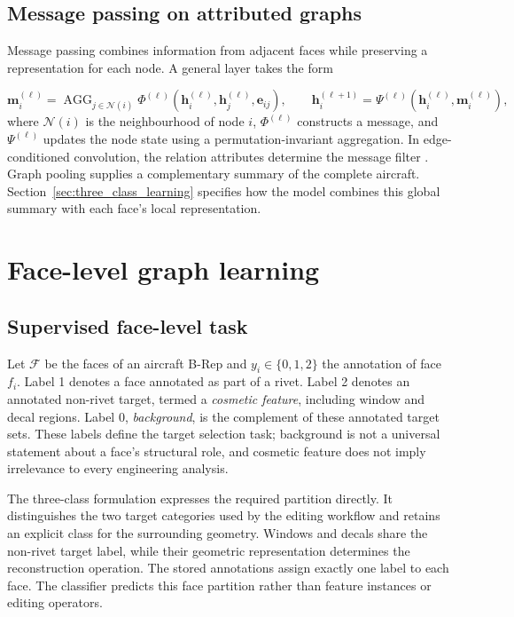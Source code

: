 \documentclass[12pt,a4paper]{article}
\begin{document}
\subsection{Message passing on attributed graphs}\label{sec:message_passing_preliminary}

Message passing combines information from adjacent faces while preserving a representation for each node. A general layer takes the form

\begin{equation}
\mathbf{m}_i^{(\ell)}=
\operatorname{AGG}_{j\in\mathcal{N}(i)}
\Phi^{(\ell)}\!\left(\mathbf{h}_i^{(\ell)},\mathbf{h}_j^{(\ell)},\mathbf{e}_{ij}\right),
\qquad
\mathbf{h}_i^{(\ell+1)}=
\Psi^{(\ell)}\!\left(\mathbf{h}_i^{(\ell)},\mathbf{m}_i^{(\ell)}\right),
\label{eq:generic_message_passing}
\end{equation}
where $\mathcal{N}(i)$ is the neighbourhood of node $i$, $\Phi^{(\ell)}$ constructs a message, and $\Psi^{(\ell)}$ updates the node state using a permutation-invariant aggregation. In edge-conditioned convolution, the relation attributes determine the message filter \parencite{simonovsky2017dynamic}. Graph pooling supplies a complementary summary of the complete aircraft. Section~\ref{sec:three_class_learning} specifies how the model combines this global summary with each face's local representation.

\FloatBarrier
\section{Face-level graph learning}\label{sec:methods}

\subsection{Supervised face-level task}\label{sec:data_preparation}

Let $\mathcal{F}$ be the faces of an aircraft B-Rep and $y_i\in\{0,1,2\}$ the annotation of face $f_i$. Label 1 denotes a face annotated as part of a rivet. Label 2 denotes an annotated non-rivet target, termed a \textit{cosmetic feature}, including window and decal regions. Label 0, \textit{background}, is the complement of these annotated target sets. These labels define the target selection task; background is not a universal statement about a face's structural role, and cosmetic feature does not imply irrelevance to every engineering analysis.

The three-class formulation expresses the required partition directly. It distinguishes the two target categories used by the editing workflow and retains an explicit class for the surrounding geometry. Windows and decals share the non-rivet target label, while their geometric representation determines the reconstruction operation. The stored annotations assign exactly one label to each face. The classifier predicts this face partition rather than feature instances or editing operators.
\end{document}
